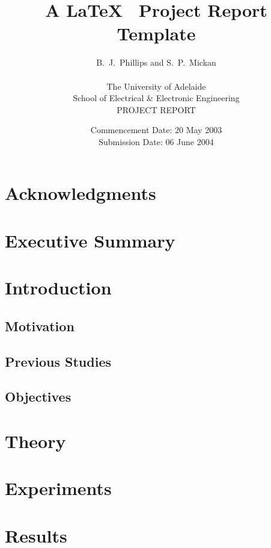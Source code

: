 \documentclass[a4paper,12pt]{article}
\title{A \LaTeX~ Project Report Template}
\author{B.~J.~Phillips and S.~P.~Mickan\\
\\
The University of Adelaide\\
School of Electrical \& Electronic Engineering\\
PROJECT REPORT}
\date{Commencement Date: 20 May 2003\\
Submission Date: 06 June 2004}
\begin{document}
\maketitle

\newpage
\section*{Acknowledgments}


\newpage
\section*{Executive Summary}


\newpage

\tableofcontents

\newpage
\section{Introduction}


\subsection{Motivation}


\subsection{Previous Studies}


\subsection{Objectives}


\section{Theory}


\section{Experiments}


\section{Results}

\end{document}
